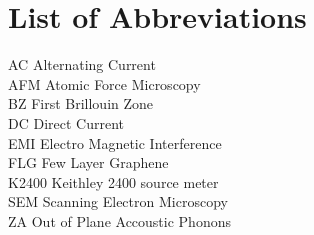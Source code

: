 \chapter*{List of Abbreviations}

\noindent
AC \hfill Alternating Current \\
AFM \hfill Atomic Force Microscopy \\
BZ \hfill First Brillouin Zone \\
DC \hfill Direct Current \\
EMI \hfill Electro Magnetic Interference \\
FLG \hfill Few Layer Graphene \\
K2400 \hfill Keithley 2400 source meter \\
SEM \hfill Scanning Electron Microscopy \\
ZA \hfill Out of Plane Accoustic Phonons

\newpage